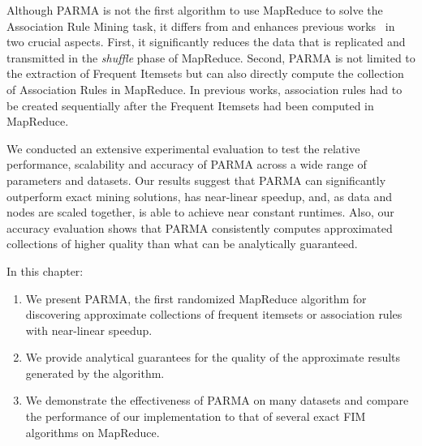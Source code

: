 Although PARMA is not the first algorithm to use MapReduce to solve the
Association Rule Mining task, it differs from and enhances previous
works~\citep{CryansRC10,GhotingKPK11,Hammoud11,LiWZZC08,LiZ11,YangLF10,ZhouZCLF10}
in two crucial aspects. First, it significantly reduces the data that is
replicated and transmitted in the \emph{shuffle} phase of MapReduce.  Second,
PARMA is not limited to the extraction of Frequent Itemsets but can also
directly compute the collection of Association Rules in MapReduce. In previous
works, association rules had to be created sequentially after the Frequent
Itemsets had been computed in MapReduce. 

We conducted an extensive experimental evaluation to test the relative
performance, scalability and accuracy of PARMA across a wide range of
parameters and datasets. Our results suggest that PARMA can
significantly outperform exact mining solutions, has
near-linear speedup, and, as data and nodes are scaled together, is
able to achieve near constant runtimes. Also, our accuracy evaluation
shows that PARMA consistently computes approximated collections
of higher quality than what can be analytically guaranteed.

In this chapter:
\begin{enumerate}
\item We present PARMA, the first randomized MapReduce algorithm for discovering
  approximate collections of frequent itemsets or association rules with
  near-linear speedup.
\item We provide analytical guarantees for the quality of the approximate
  results generated by the algorithm.
\item We demonstrate the effectiveness of PARMA on many datasets and compare
  the performance of our implementation to that of several exact FIM algorithms
  on MapReduce.
\end{enumerate}

